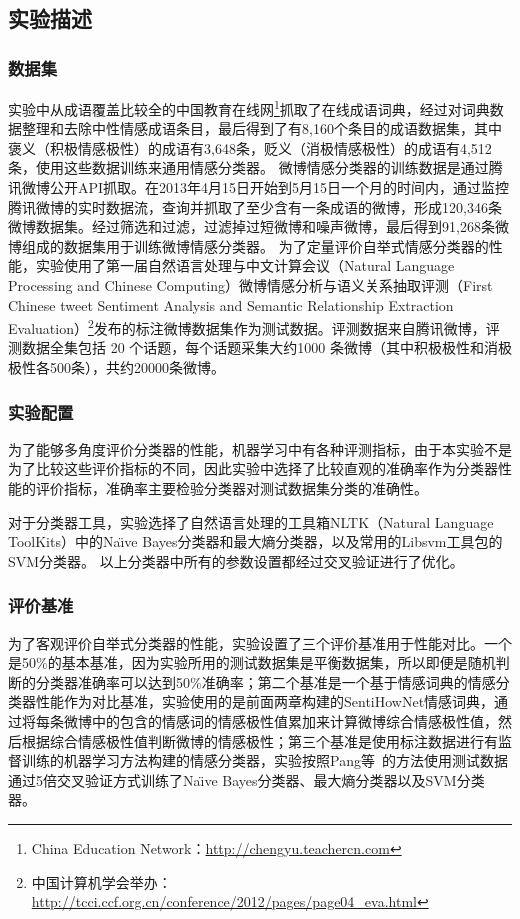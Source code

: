 \subsection{实验描述}
\label{description}

\subsubsection{数据集}
实验中从成语覆盖比较全的中国教育在线网\footnote{China Education Network：\url{http://chengyu.teachercn.com}}抓取了在线成语词典，经过对词典数据整理和去除中性情感成语条目，最后得到了有8,160个条目的成语数据集，其中褒义（积极情感极性）的成语有3,648条，贬义（消极情感极性）的成语有4,512条，使用这些数据训练来通用情感分类器。
微博情感分类器的训练数据是通过腾讯微博公开API抓取。在2013年4月15日开始到5月15日一个月的时间内，通过监控腾讯微博的实时数据流，查询并抓取了至少含有一条成语的微博，形成120,346条微博数据集。经过筛选和过滤，过滤掉过短微博和噪声微博，最后得到91,268条微博组成的数据集用于训练微博情感分类器。
为了定量评价自举式情感分类器的性能，实验使用了第一届自然语言处理与中文计算会议（Natural Language Processing and Chinese Computing）微博情感分析与语义关系抽取评测（First Chinese tweet Sentiment Analysis and Semantic Relationship Extraction Evaluation）\footnote{中国计算机学会举办：\url{http://tcci.ccf.org.cn/conference/2012/pages/page04_eva.html}}发布的标注微博数据集作为测试数据。评测数据来自腾讯微博，评测数据全集包括 20 个话题，每个话题采集大约1000
条微博（其中积极极性和消极极性各500条），共约20000条微博。
 
\subsubsection{实验配置}
为了能够多角度评价分类器的性能，机器学习中有各种评测指标，由于本实验不是为了比较这些评价指标的不同，因此实验中选择了比较直观的准确率作为分类器性能的评价指标，准确率主要检验分类器对测试数据集分类的准确性。

对于分类器工具，实验选择了自然语言处理的工具箱NLTK（Natural Language ToolKits）中的Na\"\i ve Bayes分类器和最大熵分类器，以及常用的Libsvm工具包的SVM分类器。
以上分类器中所有的参数设置都经过交叉验证进行了优化。

\subsubsection{评价基准}
为了客观评价自举式分类器的性能，实验设置了三个评价基准用于性能对比。一个是50\%的基本基准，因为实验所用的测试数据集是平衡数据集，所以即便是随机判断的分类器准确率可以达到50\%准确率；第二个基准是一个基于情感词典的情感分类器性能作为对比基准，实验使用的是前面两章构建的SentiHowNet情感词典，通过将每条微博中的包含的情感词的情感极性值累加来计算微博综合情感极性值，然后根据综合情感极性值判断微博的情感极性；第三个基准是使用标注数据进行有监督训练的机器学习方法构建的情感分类器，实验按照Pang等~的方法使用测试数据通过5倍交叉验证方式训练了Na\"\i ve Bayes分类器、最大熵分类器以及SVM分类器。

